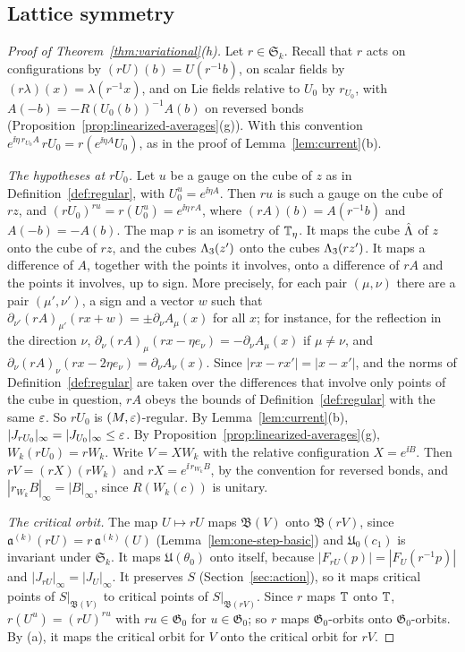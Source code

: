 \subsection{Lattice symmetry}\label{subsec:var-symmetry}

\begin{proof}[Proof of Theorem~\ref{thm:variational}(h)]
Let $r\in\mathfrak S_k$. Recall that $r$ acts on configurations by $(rU)(b)=U(r^{-1}b)$, on scalar fields by $(r\lambda)(x)=\lambda(r^{-1}x)$, and on Lie fields relative to $U_0$ by $r_{U_0}$, with $A(-b)=-R(U_0(b))^{-1}A(b)$ on reversed bonds (Proposition~\ref{prop:linearized-averages}(g)). With this convention $e^{\ii\eta\,r_{U_0}A}\,rU_0=r(e^{\ii\eta A}U_0)$, as in the proof of Lemma~\ref{lem:current}(b).

\emph{The hypotheses at $rU_0$.} Let $u$ be a gauge on the cube of $z$ as in Definition~\ref{def:regular}, with $U_0^u=e^{\ii\eta A}$. Then $ru$ is such a gauge on the cube of $rz$, and $(rU_0)^{ru}=r(U_0^u)=e^{\ii\eta\,rA}$, where $(rA)(b)=A(r^{-1}b)$ and $A(-b)=-A(b)$. The map $r$ is an isometry of $\mathbb T_\eta$. It maps the cube $\hat{\Lambda}$ of $z$ onto the cube of $rz$, and the cubes $\Lambda_3(z')$ onto the cubes $\Lambda_3(rz')$. It maps a difference of $A$, together with the points it involves, onto a difference of $rA$ and the points it involves, up to sign. More precisely, for each pair $(\mu,\nu)$ there are a pair $(\mu',\nu')$, a sign and a vector $w$ such that $\partial_{\nu'}(rA)_{\mu'}(rx+w)=\pm\partial_\nu A_\mu(x)$ for all $x$; for instance, for the reflection in the direction $\nu$, $\partial_\nu(rA)_\mu(rx-\eta e_\nu)=-\partial_\nu A_\mu(x)$ if $\mu\ne\nu$, and $\partial_\nu(rA)_\nu(rx-2\eta e_\nu)=\partial_\nu A_\nu(x)$. Since $|rx-rx'|=|x-x'|$, and the norms of Definition~\ref{def:regular} are taken over the differences that involve only points of the cube in question, $rA$ obeys the bounds of Definition~\ref{def:regular} with the same $\varepsilon$. So $rU_0$ is $(M,\varepsilon)$-regular. By Lemma~\ref{lem:current}(b), $|J_{rU_0}|_\infty=|J_{U_0}|_\infty\le\varepsilon$. By Proposition~\ref{prop:linearized-averages}(g), $W_k(rU_0)=rW_k$. Write $V=XW_k$ with the relative configuration $X=e^{\ii B}$. Then $rV=(rX)(rW_k)$ and $rX=e^{\ii\,r_{W_k}B}$, by the convention for reversed bonds, and $|r_{W_k}B|_\infty=|B|_\infty$, since $R(W_k(c))$ is unitary.

\emph{The critical orbit.} The map $U\mapsto rU$ maps $\mathfrak B(V)$ onto $\mathfrak B(rV)$, since $\mathfrak a^{(k)}(rU)=r\,\mathfrak a^{(k)}(U)$ (Lemma~\ref{lem:one-step-basic}) and $\mathfrak U_0(c_1)$ is invariant under $\mathfrak S_k$. It maps $\mathfrak U(\theta_0)$ onto itself, because $|F_{rU}(p)|=|F_U(r^{-1}p)|$ and $|J_{rU}|_\infty=|J_U|_\infty$. It preserves $S$ (Section~\ref{sec:action}), so it maps critical points of $S|_{\mathfrak B(V)}$ to critical points of $S|_{\mathfrak B(rV)}$. Since $r$ maps $\mathbb T$ onto $\mathbb T$, $r(U^u)=(rU)^{ru}$ with $ru\in\mathfrak G_0$ for $u\in\mathfrak G_0$; so $r$ maps $\mathfrak G_0$-orbits onto $\mathfrak G_0$-orbits. By (a), it maps the critical orbit for $V$ onto the critical orbit for $rV$.


\end{proof}
